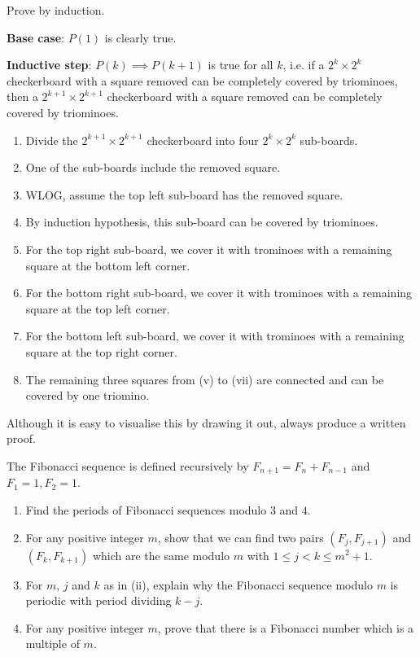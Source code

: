 \begin{solution}
Prove by induction.

\textbf{Base case}: $P(1)$ is clearly true.

\textbf{Inductive step}: $P(k)\implies P(k+1)$ is true for all $k$, i.e. if a $2^k\times2^k$ checkerboard with a square removed can be completely covered by triominoes, then a $2^{k+1}\times2^{k+1}$ checkerboard with a square removed can be completely covered by triominoes.

\begin{enumerate}[label=(\roman*)]
\item Divide the $2^{k+1}\times2^{k+1}$ checkerboard into four $2^k\times2^k$ sub-boards.
\item One of the sub-boards include the removed square.
\item WLOG, assume the top left sub-board has the removed square.
\item By induction hypothesis, this sub-board can be covered by triominoes.
\item For the top right sub-board, we cover it with trominoes with a remaining square at the bottom left corner.
\item For the bottom right sub-board, we cover it with trominoes with a remaining square at the top left corner.
\item For the bottom left sub-board, we cover it with trominoes with a remaining square at the top right corner.
\item The remaining three squares from (v) to (vii) are connected and can be covered by one triomino.
\end{enumerate}
\end{solution}

\begin{remark}
Although it is easy to visualise this by drawing it out, always produce a written proof.
\end{remark}

\begin{prbm}
The Fibonacci sequence is defined recursively by $F_{n+1}=F_n+F_{n-1}$ and $F_1=1,F_2=1$.
\begin{enumerate}[label=(\roman*)]
\item Find the periods of Fibonacci sequences modulo $3$ and $4$.
\item For any positive integer $m$, show that we can find two pairs $(F_j,F_{j+1})$ and $(F_k,F_{k+1})$ which are the same modulo $m$ with $1\le j<k\le m^2+1$.
\item For $m$, $j$ and $k$ as in (ii), explain why the Fibonacci sequence modulo $m$ is periodic
with period dividing $k-j$.
\item For any positive integer $m$, prove that there is a Fibonacci number which is a multiple of $m$.
\end{enumerate}
\end{prbm}

